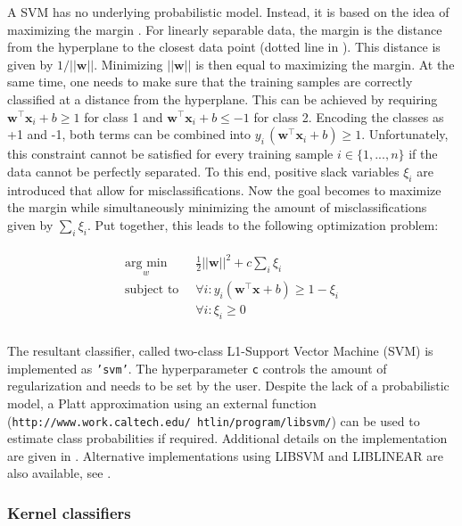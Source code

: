 \documentclass[utf8]{frontiersSCNS} %
\newcommand{\w}{\mathbf{w}}
\newcommand{\x}{\mathbf{x}}
\newcommand{\ttt}[1]{\texttt{#1}}
\begin{document}
A SVM has no underlying probabilistic model. Instead, it is based on the idea of maximizing the margin \citep{Scholkopf2001LearningBeyond,Hearst1998SupportMachines}. For linearly separable data, the margin is the distance from the hyperplane to the closest data point (dotted line in ). This distance is given by $1/||\w||$. Minimizing $||\w||$ is then equal to maximizing the margin. At the same time, one needs to make sure that the training samples are correctly classified at a distance from the hyperplane. This can be achieved by requiring
$\w^\top\x_i + b\ge 1$ for class 1 and $\w^\top\x_i + b\le -1$ for class 2. Encoding the classes as +1 and -1, both terms can be combined into $y_i\, (\w^\top\x_i + b) \ge 1$. Unfortunately, this constraint cannot be satisfied for every training sample $i\in\{1,...,n\}$ if the data cannot be perfectly separated. To this end, positive slack variables $\xi_i$ are introduced that allow for misclassifications. Now the goal becomes to maximize the margin while simultaneously minimizing the amount of misclassifications given by $\sum_i \xi_i$. Put together, this leads to the following optimization problem:

\begin{align}
\begin{split}
\label{eq:svm_primal}
\underset{w}{\text{arg min}} &\ \frac{1}{2}||\w||^2 + c\sum_i \xi_i\\
\text{subject to } &\ \forall i: y_i (\w^\top\x + b) \ge 1 - \xi_i\\
&\ \forall i: \xi_i \ge 0\\
\end{split}
\end{align}

The resultant classifier, called two-class L1-Support Vector Machine (SVM) is implemented as \ttt{'svm'}. The hyperparameter \ttt{c} controls the amount of regularization and needs to be set by the user. Despite the lack of a probabilistic model, a Platt approximation using an external function (\ttt{http://www.work.caltech.edu/~htlin/program/libsvm/}) can be used to estimate class probabilities if required. Additional details on the implementation are given in . Alternative implementations using LIBSVM and LIBLINEAR are also available, see .

\subsubsection{Kernel classifiers}\label{sec:kernel-methods}
\end{document}
